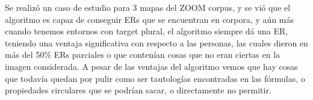 Se realiz\'o un caso de estudio para 3 mapas del ZOOM corpus, y se vi\'o que el algoritmo es capaz de conseguir ERs que se encuentran en corpora, y a\'un m\'as cuando tenemos entornos con target plural, el algoritmo siempre d\'a una ER, teniendo una ventaja significativa con respecto a las personas, las cuales dieron en m\'as del 50\% ERs parciales o que conten\'ian cosas que no eran ciertas en la imagen considerada. A pesar de las ventajas del algoritmo vemos que hay cosas que todav\'ia quedan por pulir como ser tautolog\'ias encontradas en las f\'ormulas, o propiedades circulares que se podr\'ian sacar, o directamente no permitir.

 

